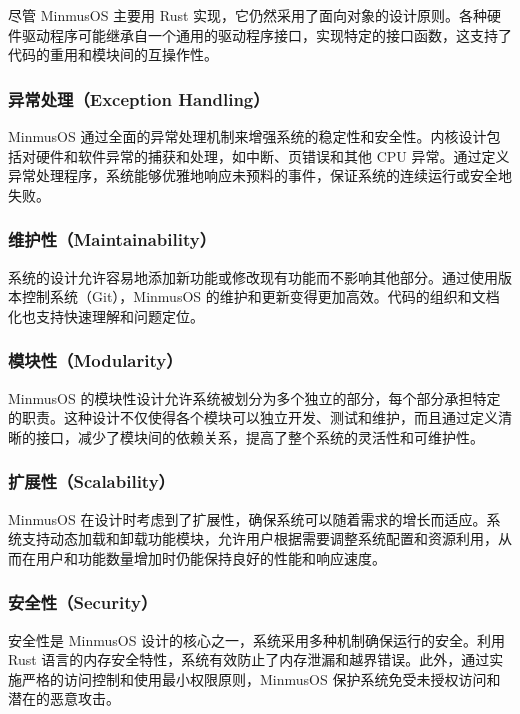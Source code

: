 尽管 MinmusOS 主要用 Rust 实现，它仍然采用了面向对象的设计原则。各种硬件驱动程序可能继承自一个通用的驱动程序接口，实现特定的接口函数，这支持了代码的重用和模块间的互操作性。

\subsubsection{异常处理（Exception Handling）}

MinmusOS 通过全面的异常处理机制来增强系统的稳定性和安全性。内核设计包括对硬件和软件异常的捕获和处理，如中断、页错误和其他 CPU 异常。通过定义异常处理程序，系统能够优雅地响应未预料的事件，保证系统的连续运行或安全地失败。

\subsubsection{维护性（Maintainability）}

系统的设计允许容易地添加新功能或修改现有功能而不影响其他部分。通过使用版本控制系统（Git），MinmusOS 的维护和更新变得更加高效。代码的组织和文档化也支持快速理解和问题定位。

\subsubsection{模块性（Modularity）}

MinmusOS 的模块性设计允许系统被划分为多个独立的部分，每个部分承担特定的职责。这种设计不仅使得各个模块可以独立开发、测试和维护，而且通过定义清晰的接口，减少了模块间的依赖关系，提高了整个系统的灵活性和可维护性。

\subsubsection{扩展性（Scalability）}

MinmusOS 在设计时考虑到了扩展性，确保系统可以随着需求的增长而适应。系统支持动态加载和卸载功能模块，允许用户根据需要调整系统配置和资源利用，从而在用户和功能数量增加时仍能保持良好的性能和响应速度。

\subsubsection{安全性（Security）}

安全性是 MinmusOS 设计的核心之一，系统采用多种机制确保运行的安全。利用 Rust 语言的内存安全特性，系统有效防止了内存泄漏和越界错误。此外，通过实施严格的访问控制和使用最小权限原则，MinmusOS 保护系统免受未授权访问和潜在的恶意攻击。

